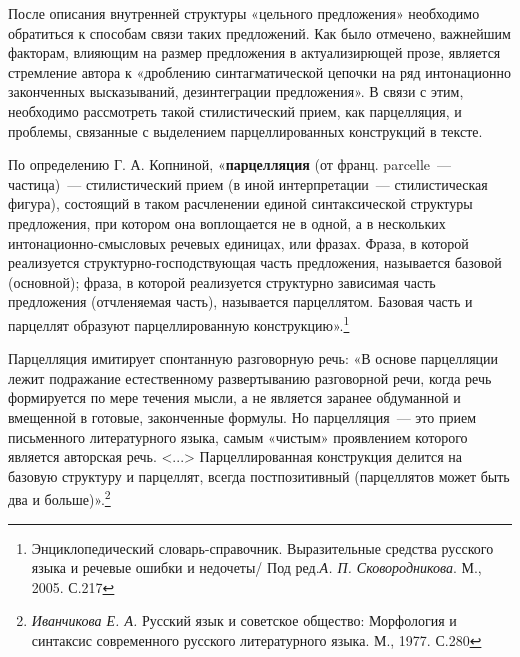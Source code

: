 \documentclass{kursa4}
\begin{document}
{      После описания внутренней структуры «цельного предложения» необходимо обратиться к способам связи таких предложений. Как было отмечено, важнейшим факторам, влияющим на размер предложения в актуализирющей прозе, является стремление автора к «дроблению синтагматической цепочки на ряд интонационно законченных высказываний, дезинтеграции предложения». В связи с этим, необходимо рассмотреть такой стилистический прием, как парцелляция, и проблемы, связанные с выделением парцеллированных конструкций в тексте. 

      По определению Г. А.
      Копниной, «\textbf{парцелляция} (от франц. parcelle~--- частица)~--- стилистический прием (в иной
      интерпретации~--- стилистическая фигура), состоящий в таком расчленении
      единой синтаксической структуры предложения, при котором она
      воплощается не в одной, а в нескольких интонационно-смысловых речевых
      единицах, или фразах. Фраза, в которой реализуется
      структурно-господствующая часть предложения, называется базовой
      (основной); фраза, в которой реализуется структурно зависимая часть
      предложения (отчленяемая часть), называется парцеллятом. Базовая часть
      и парцеллят образуют парцеллированную
      конструкцию».\footnote{Энциклопедический
      словарь-справочник. Выразительные средства русского языка и речевые
      ошибки и недочеты/ Под ред.\textit{А. П.
      Сковородникова}{. М., 2005. С.217}}

      {Парцелляция имитирует спонтанную разговорную речь:
      «В основе парцелляции лежит подражание естественному развертыванию
      разговорной речи, когда речь формируется по мере течения мысли, а не
      является заранее обдуманной и вмещенной в готовые, законченные формулы.
      Но парцелляция~--- это прием письменного литературного языка, самым
      «чистым» проявлением которого является авторская речь.
      \textless{}...\textgreater{} Парцеллированная конструкция делится на
      базовую структуру и парцеллят, }{всегда
      постпозитивный}{ (парцеллятов может быть два и
      больше)».}\footnote{\textit{{ Иванчикова Е. А.
      }}{Русский язык и советское общество: Морфология и
      синтаксис современного русского литературного языка. М.,
      1977.}\textit{{
      }}{С.280}}{ }

}
\end{document}
